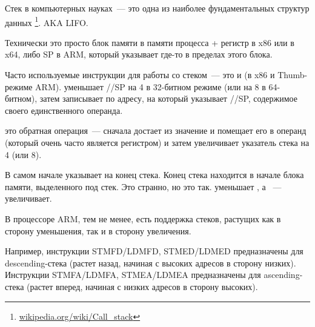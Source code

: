 \mysection{\Stack}
\label{sec:stack}
\myindex{\Stack}

Стек в компьютерных науках~--- это одна из наиболее фундаментальных структур данных
\footnote{\href{http://en.wikipedia.org/wiki/Call_stack}{wikipedia.org/wiki/Call\_stack}}.
\ac{AKA} \ac{LIFO}.

Технически это просто блок памяти в памяти процесса + регистр \ESP в x86 или \RSP в x64, либо \ac{SP} в ARM, который указывает где-то в пределах этого блока.

Часто используемые инструкции для работы со стеком~--- это \PUSH и \POP (в x86 и Thumb-режиме ARM). 
\PUSH уменьшает \ESP/\RSP/\ac{SP} на 4 в 32-битном режиме (или на 8 в 64-битном),
затем записывает по адресу, на который указывает \ESP/\RSP/\ac{SP}, содержимое своего единственного операнда.

\POP это обратная операция~--- сначала достает из  значение и помещает его в операнд 
(который очень часто является регистром) и затем увеличивает указатель стека на 4 (или 8).

В самом начале  указывает на конец стека.
Конец стека находится в начале блока памяти, выделенного под стек. Это странно, но это так.
\PUSH уменьшает , а \POP~--- увеличивает.

В процессоре ARM, тем не менее, есть поддержка стеков, растущих как в сторону уменьшения, так и в сторону увеличения.


Например, инструкции \ac{STMFD}/\ac{LDMFD}, \ac{STMED}/\ac{LDMED} предназначены для descending-стека (растет назад, начиная с высоких адресов в сторону низких).\\
Инструкции \ac{STMFA}/\ac{LDMFA}, \ac{STMEA}/\ac{LDMEA} предназначены для ascending-стека (растет вперед, начиная с низких адресов в сторону высоких).


